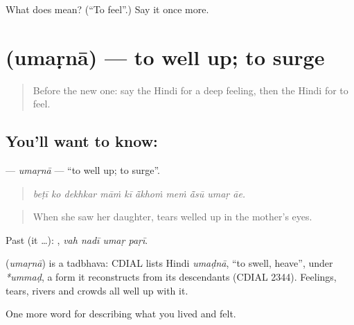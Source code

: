 \begin{tcolorbox}[breakable,colback=teal!4,colframe=teal!35!black,title={Before you move on}]
What does   mean? (\textquotedblleft{}To feel\textquotedblright{}.) Say it once more.
\end{tcolorbox}
\section[\texorpdfstring{\hi{उमड़ना} (umaṛnā)}{उमड़ना (umaṛnā)}]{ (umaṛnā) — to well up; to surge}

\label{lesson:HI-C452-umarna}



\begin{quote}
Before the new one: say the Hindi for a deep feeling, then the Hindi for to feel.
\end{quote}

\subsection*{You'll want to know: }
\textbf{} — \emph{umaṛnā} — \textquotedblleft{}to well up; to surge\textquotedblright{}.

\begin{quote}
         
\end{quote}

\begin{quote}
\emph{beṭī ko dekhkar māṁ kī ā̃khoṁ meṁ ā̃sū umaṛ āe.}
\end{quote}

\begin{quote}
When she saw her daughter, tears welled up in the mother's eyes.
\end{quote}

Past (it …):    , \emph{vah nadī umaṛ paṛī}.

\begin{cousinweb}
\textbf{} (\emph{umaṛnā}) is a tadbhava: CDIAL lists Hindi \emph{umaḍnā}, \textquotedblleft{}to swell, heave\textquotedblright{}, under \emph{*ummaḍ}, a form it reconstructs from its descendants (CDIAL 2344). Feelings, tears, rivers and crowds all well up with it.
\end{cousinweb}

\begin{grammarlens}[title={What you've built}]
One more word for describing what you lived and felt.
\end{grammarlens}

